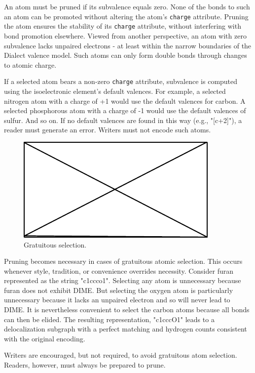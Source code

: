\documentclass{article}
\def\ttt{\texttt}
\begin{document}
An atom must be pruned if its subvalence equals zero. None of the bonds to such an atom can be promoted without altering the atom's \ttt{charge} attribute. Pruning the atom ensures the stability of its \ttt{charge} attribute, without interfering with bond promotion elsewhere. Viewed from another perspective, an atom with zero subvalence lacks unpaired electrons - at least within the narrow boundaries of the Dialect valence model. Such atoms can only form double bonds through changes to atomic charge. 

If a selected atom bears a non-zero \ttt{charge} attribute, subvalence is computed using the isoelectronic element's default valences. For example, a selected nitrogen atom with a charge of +1 would use the default valences for carbon. A selected phosphorous atom with a charge of -1 would use the default valences of sulfur. And so on. If no default valences are found in this way (e.g., "[c+2]"), a reader must generate an error. Writers must not encode such atoms.

\begin{figure}
    \centering
    \includegraphics{filler}
    \caption{Gratuitous selection.}
    \label{fig:gratuitous-selection}
\end{figure}

Pruning becomes necessary in cases of gratuitous atomic selection. This occurs whenever style, tradition, or convenience overrides necessity. Consider furan represented as the string "c1ccco1". Selecting any atom is unnecessary because furan does not exhibit DIME. But selecting the oxygen atom is particularly unnecessary because it lacks an unpaired electron and so will never lead to DIME. It is nevertheless convenient to select the carbon atoms because all bonds can then be elided. The resulting representation, "c1cccO1" leads to a delocalization subgraph with a perfect matching and hydrogen counts consistent with the original encoding.

Writers are encouraged, but not required, to avoid gratuitous atom selection. Readers, however, must always be prepared to prune.
\end{document}
